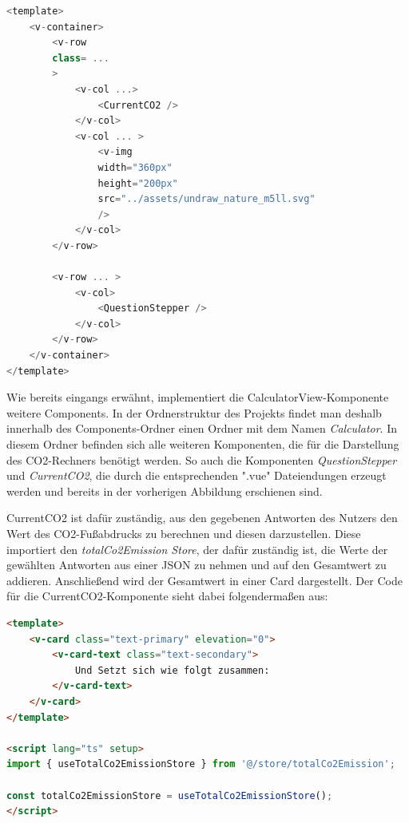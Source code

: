 \begin{lstlisting}[language={JavaScript}, caption={Aufbau der CalculatorView.vue Komponente}]
<template>
    <v-container>
        <v-row
        class= ...
        >
            <v-col ...>
                <CurrentCO2 />
            </v-col>
            <v-col ... >
                <v-img
                width="360px"
                height="200px"
                src="../assets/undraw_nature_m5ll.svg"
                />
            </v-col>
        </v-row>

        <v-row ... >
            <v-col>
                <QuestionStepper />
            </v-col>
        </v-row>
    </v-container>
</template>
\end{lstlisting}

Wie bereits eingangs erwähnt, implementiert die CalculatorView-Komponente weitere Components.
In der Ordnerstruktur des Projekts findet man deshalb innerhalb des Components-Ordner einen Ordner mit dem Namen \textit{Calculator}.
In diesem Ordner befinden sich alle weiteren Komponenten, die für die Darstellung des CO2-Rechners benötigt werden.
So auch die Komponenten \textit{QuestionStepper} und \textit{CurrentCO2}, die durch die entsprechenden ".vue" Dateiendungen erzeugt werden und bereits in der vorherigen Abbildung erschienen sind.

CurrentCO2 ist dafür zuständig, aus den gegebenen Antworten des Nutzers den Wert des CO2-Fußabdrucks zu berechnen und diesen darzustellen.
Diese importiert den \textit{totalCo2Emission Store}, der dafür zuständig ist, die Werte der gewählten Antworten aus einer JSON zu nehmen und auf den Gesamtwert zu addieren.
Anschließend wird der Gesamtwert in einer Card dargestellt.
Der Code für die CurrentCO2-Komponente sieht dabei folgendermaßen aus:

\begin{lstlisting}[language={html}, caption={CurrentCO2.vue}]
<template>
    <v-card class="text-primary" elevation="0">
        <v-card-text class="text-secondary">
            Und Setzt sich wie folgt zusammen:
        </v-card-text>
    </v-card>
</template>

<script lang="ts" setup>
import { useTotalCo2EmissionStore } from '@/store/totalCo2Emission';

const totalCo2EmissionStore = useTotalCo2EmissionStore();
</script>
\end{lstlisting}

